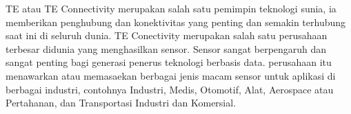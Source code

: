 
TE atau TE Connectivity merupakan salah satu pemimpin teknologi sunia, ia memberikan penghubung dan konektivitas yang penting dan semakin terhubung saat ini di seluruh dunia. TE Conectivity merupakan salah satu perusahaan terbesar didunia yang menghasilkan sensor. Sensor sangat berpengaruh dan sangat penting bagi generasi penerus teknologi berbasis data. perusahaan itu menawarkan atau memasaekan berbagai jenis macam sensor untuk aplikasi di berbagai industri, contohnya Industri, Medis, Otomotif, Alat, Aerospace atau Pertahanan, dan Transportasi Industri dan Komersial.